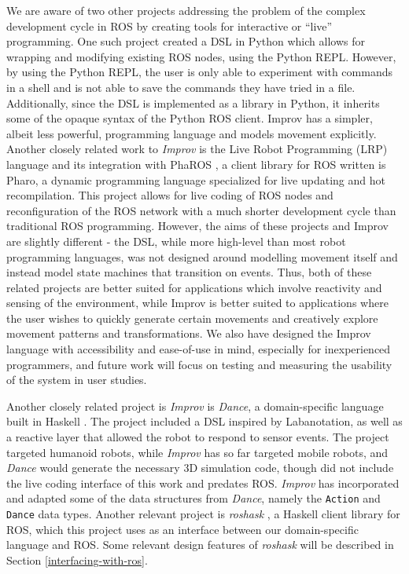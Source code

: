 \documentclass[sigconf]{acmart}
\begin{document}
We are aware of two other projects addressing the problem of the complex
development cycle in ROS by creating tools for interactive or ``live''
programming. One such project \cite{python_live_DSLRob} created a DSL in Python
which allows for wrapping and modifying existing ROS nodes, using the Python
REPL. However, by using the Python REPL, the user is only able to experiment
with commands in a shell and is not able to save the commands they have tried in
a file. Additionally, since the DSL is implemented as a library in Python, it
inherits some of the opaque syntax of the Python ROS client. Improv has a
simpler, albeit less powerful, programming language and models movement
explicitly. Another closely related work to \emph{Improv} is the Live Robot
Programming (LRP) language \cite{campusano2017live} and its integration with PhaROS
\cite{estefo2014towards}, a client library for ROS written is Pharo, a dynamic
programming language specialized for live updating and hot recompilation. This
project allows for live coding of ROS nodes and reconfiguration of the ROS
network with a much shorter development cycle than traditional ROS programming.
However, the aims of these projects and Improv are slightly different - the DSL,
while more high-level than most robot programming languages, was not designed
around modelling movement itself and instead model state machines that
transition on events. Thus, both of these related projects are better suited for
applications which involve reactivity and sensing of the environment, while
Improv is better suited to applications where the user wishes to quickly
generate certain movements and creatively explore movement patterns and
transformations. We also have designed the Improv language with accessibility
and ease-of-use in mind, especially for inexperienced programmers, and future
work will focus on testing and measuring the usability of the system in user
studies.

Another closely related project is \emph{Improv} is \emph{Dance}, a
domain-specific language built in Haskell \cite{Dance2003}. The project included
a DSL inspired by Labanotation, as well as a reactive layer that allowed
the robot to respond to sensor events. The project targeted humanoid
robots, while \emph{Improv} has so far targeted mobile robots, and
\emph{Dance} would generate the necessary 3D simulation code, though did
not include the live coding interface of this work and predates ROS.
\emph{Improv} has incorporated and adapted some of the data structures
from \emph{Dance}, namely the \texttt{Action} and \texttt{Dance} data
types. Another relevant project is \emph{roshask} \cite{cowley2011stream}, a Haskell client library for
ROS, which this project uses as an interface between our domain-specific
language and ROS. Some relevant design features of \emph{roshask} will be
described in Section \ref{interfacing-with-ros}.
\end{document}
